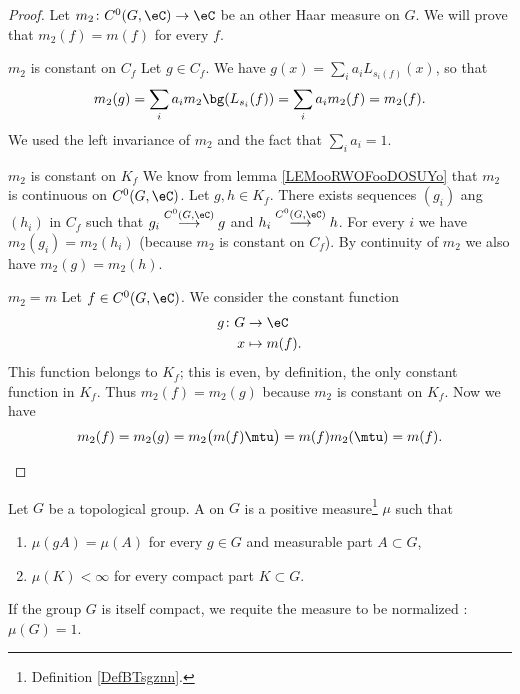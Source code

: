\begin{proof}
    Let \( m_2\colon C^0(G,\eC)\to \eC\) be an other Haar measure on \( G\). We will prove that \( m_2(f)=m(f)\) for every \( f\). 
    \begin{subproof}
    \item[\( m_2\) is constant on \( C_f\)]
        Let \( g\in C_f\). We have \( g(x)=\sum_ia_iL_{s_i(f)}(x)\), so that
        \begin{equation}
            m_2(g)=\sum_ia_im_2\bg(L_{s_i}(f))=\sum_ia_im_2(f)=m_2(f).
        \end{equation}
        We used the left invariance of \( m_2\) and the fact that \( \sum_ia_i=1\).
    \item[\( m_2\) is constant on \( K_f\)]
        We know from lemma \ref{LEMooRWOFooDOSUYo} that \( m_2\) is continuous on \( C^0(G,\eC)\). Let \( g,h\in K_f\). There exists sequences \( (g_i)\) ang \( (h_i)\) in \( C_f\) such that \( g_i\stackrel{C^0(G,\eC)}{\longrightarrow}g\) and \( h_i\stackrel{C^0(G,\eC)}{\longrightarrow} h\). For every \( i\) we have \( m_2(g_i)=m_2(h_i)\) (because \( m_2\) is constant on \( C_f\)). By continuity of \( m_2\) we also have \( m_2(g)=m_2(h)\).
    \item[\( m_2=m\)]
        Let \( f\in C^0(G,\eC)\). We consider the constant function 
        \begin{equation}
            \begin{aligned}
                g\colon G&\to \eC \\
                x&\mapsto m(f). 
            \end{aligned}
        \end{equation}
        This function belongs to \( K_f\); this is even, by definition, the only constant function in \( K_f\). Thus \( m_2(f)=m_2(g)\) because \( m_2\) is constant on \( K_f\). Now we have
        \begin{equation}
            m_2(f)=m_2(g)=m_2\big( m(f)\mtu \big)=m(f)m_2(\mtu)=m(f).
        \end{equation}
    \end{subproof}
\end{proof}

\begin{definition}      \label{DEFooXIKEooWOxHlr}
    Let \( G\) be a topological group. A  on \( G\) is a positive measure\footnote{Definition \ref{DefBTsgznn}.} \( \mu\) such that
	\begin{enumerate}
		\item
		      \( \mu(gA)=\mu(A)\) for every \( g\in G\) and measurable part \( A\subset G\),
		\item
		      \( \mu(K)<\infty\) for every compact part \( K\subset G\).
	\end{enumerate}
    If the group \( G\) is itself compact, we requite the measure to be normalized : \( \mu(G)=1\).
\end{definition}

